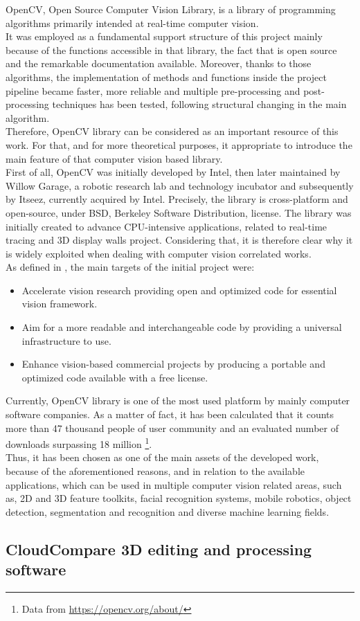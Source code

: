 OpenCV, Open Source Computer Vision Library, is a library of programming algorithms primarily intended at real-time computer vision.\\
It was employed as a fundamental support structure of this project mainly because of the functions accessible in that library, the fact that is open source and the remarkable documentation available. 
Moreover, thanks to those algorithms, the implementation of methods and functions inside the project pipeline became faster, more reliable and multiple pre-processing and post-processing techniques has been tested, following structural changing in the main algorithm.\\
Therefore, OpenCV library can be considered as an important resource of this work.
For that, and for more theoretical purposes, it appropriate to introduce the main feature of that computer vision based library.\\
First of all, OpenCV was initially developed by Intel, then later maintained by Willow Garage, a robotic research lab and technology incubator and subsequently by Itseez, currently acquired by Intel.
Precisely, the library is cross-platform and open-source, under BSD, Berkeley Software Distribution, license. 
The library was initially created to advance CPU-intensive applications, related to real-time tracing and 3D display walls project.
Considering that, it is therefore clear why it is widely exploited when dealing with computer vision correlated works.\\
As defined in \cite{bradski2008learning}, the main targets of the initial project were:
\begin{itemize}
	\item Accelerate vision research providing open and optimized code for essential vision framework.
	\item Aim for a more readable and interchangeable code by providing a universal infrastructure to use.
	\item Enhance vision-based commercial projects by producing a portable and optimized code available with a free license.
\end{itemize}
Currently, OpenCV library is one of the most used platform by mainly computer software companies.
As a matter of fact, it has been calculated that it counts more than 47 thousand people of user community and an evaluated number of downloads surpassing 18 million \footnote{Data from \url{https://opencv.org/about/}}.\\
Thus, it has been chosen as one of the main assets of the developed work, because of the aforementioned reasons, and in relation to the available applications, which can be used in multiple computer vision related areas, such as, 2D and 3D feature toolkits, facial recognition systems, mobile robotics, object detection, segmentation and recognition and diverse machine learning fields.


\subsection{CloudCompare 3D editing and processing software}
\label{subsection:cloud-compare-env}





 
